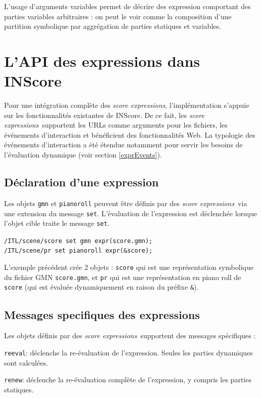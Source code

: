 \documentclass{article}
\newcommand{\OSC}[1]{\texttt{#1}}
\newcommand{\sExprs}{\emph{score expressions}}
\let\olditemize\itemize
\let\oldenditemize\enditemize
\renewenvironment{itemize} 	{\olditemize \setlength{\itemsep}{1mm}}{\oldenditemize}
\newcommand{\sample}	[1]			{\vspace{-0.2em}\begin{center}\colorbox{mygrey}{\begin{minipage}[t]{0.97\columnwidth} {\small \texttt{#1}}\end{minipage}}\end{center}}
\begin{document}
L'usage d'arguments variables permet de décrire des expression comportant des parties variables arbitraires : on peut le voir comme la composition d'une partition symbolique par aggrégation de parties statiques et variables.

\section{L'API des expressions dans INScore}
\label{exprAPI}

Pour une intégration complète des \sExprs, l'implémentation s'appuie sur les fonctionnalités existantes de INScore. De ce fait, les \sExprs\ supportent les URLs comme arguments pour les fichiers, les événements d'interaction et bénéficient des fonctionnalités Web. La typologie des événements d'interaction a été étendue notamment pour servir les besoins de l'évaluation dynamique (voir section \ref{exprEvents}).

\subsection{Déclaration d'une expression}
\label{declaringExpr}
Les objets \OSC{gmn} et \OSC{pianoroll} peuvent être définis par des \sExprs\ via une extension du message \OSC{set}.
L'évaluation de l'expression est déclenchée lorsque l'objet cible traite le message \OSC{set}.

\sample{/ITL/scene/score set gmn expr(score.gmn); \\
/ITL/scene/pr set pianoroll expr(\&score);
}

L'exemple précédent crée 2 objets : \OSC{score} qui est une représentation symbolique du fichier GMN \OSC{score.gmn}, et \OSC{pr} qui est une représentation en piano roll de \OSC{score} (qui est évaluée dynamiquement en raison du préfixe  \OSC{\&}).


\subsection{Messages specifiques des expressions}
\label{exprMsgs}
Les objets définis par des \sExprs\ supportent des messages spécifiques :
\begin{itemize}
\item \OSC{reeval}: déclenche la re-évaluation de l'expression. Seules les parties dynamiques sont calculées.
\item \OSC{renew}: déclenche la re-évaluation complète de l'expression, y compris les parties statiques. 
\end{itemize}
\end{document}
